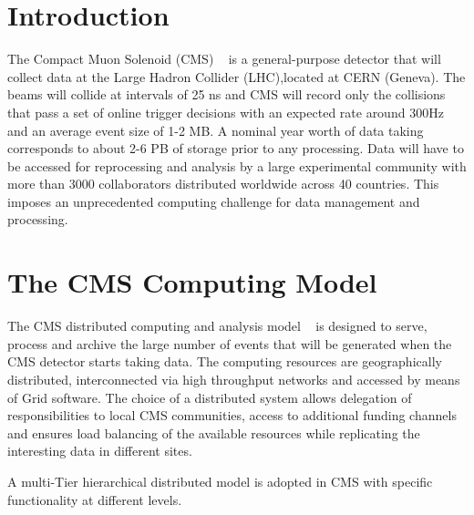 \section{Introduction}
\label{intro}
The Compact Muon Solenoid (CMS) ~\cite{RefCMS} is a general-purpose detector
that will collect data at the Large Hadron Collider (LHC),located at CERN
(Geneva).
The beams will collide at intervals of 25 ns and CMS will record only the collisions
that pass a set of %
online trigger decisions with an expected rate around 300Hz and an
average event size of 1-2 MB. A nominal year worth of data taking 
corresponds to about 2-6 PB of storage prior to any processing.
Data will have to be accessed for reprocessing and analysis by a
large experimental community with more than 3000 collaborators distributed
worldwide across 40 countries. This imposes an unprecedented computing
challenge for data management and processing.

\section{The CMS Computing Model}
\label{sec:2}
The CMS distributed computing and analysis model ~\cite{RefCM} is designed to serve, process and archive the %
large number of events that will be generated when the CMS detector starts taking data. The computing resources are geographically distributed, interconnected via high throughput networks and accessed by means of Grid software. 
The choice of a distributed system allows delegation of responsibilities to local CMS communities, access to additional funding channels and ensures load balancing of the available resources while replicating the interesting data in different sites.


A multi-Tier hierarchical distributed model is adopted in CMS with specific functionality at different levels.
